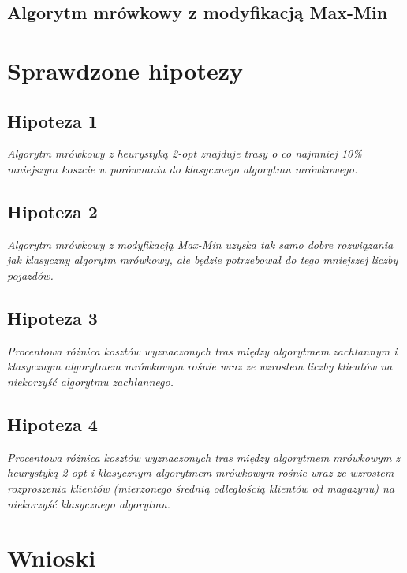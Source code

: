 \documentclass{article}
\begin{document}
\subsection{Algorytm mrówkowy z modyfikacją Max-Min}



\section{Sprawdzone hipotezy}

\subsection{Hipoteza 1}
\textit{Algorytm mrówkowy z heurystyką 2-opt znajduje trasy o co najmniej 10\% mniejszym koszcie w porównaniu do klasycznego algorytmu mrówkowego.}

\subsection{Hipoteza 2}
\textit{Algorytm mrówkowy z modyfikacją Max-Min uzyska tak samo dobre rozwiązania jak klasyczny algorytm mrówkowy, ale będzie potrzebował do tego mniejszej liczby pojazdów.}

\subsection{Hipoteza 3}
\textit{Procentowa różnica kosztów wyznaczonych tras między algorytmem zachłannym i klasycznym algorytmem mrówkowym rośnie wraz ze wzrostem liczby klientów na niekorzyść algorytmu zachłannego.}

\subsection{Hipoteza 4}
\textit{Procentowa różnica kosztów wyznaczonych tras między algorytmem mrówkowym z heurystyką 2-opt i klasycznym algorytmem mrówkowym rośnie wraz ze wzrostem rozproszenia klientów (mierzonego średnią odległością klientów od magazynu) na niekorzyść klasycznego algorytmu.}

\section{Wnioski}


\nocite{*}


\end{document}
